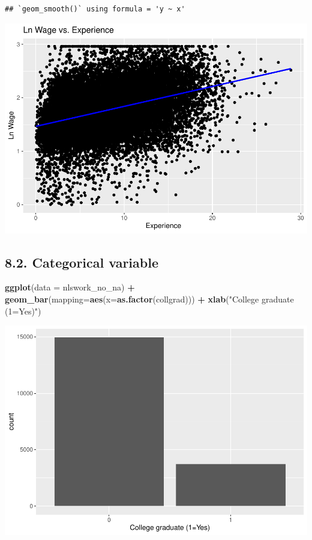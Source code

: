 \documentclass[
]{article}
\newenvironment{Shaded}{\begin{snugshade}}{\end{snugshade}}
\newcommand{\AttributeTok}[1]{\textcolor[rgb]{0.13,0.29,0.53}{#1}}
\newcommand{\FunctionTok}[1]{\textcolor[rgb]{0.13,0.29,0.53}{\textbf{#1}}}
\newcommand{\NormalTok}[1]{#1}
\newcommand{\SpecialCharTok}[1]{\textcolor[rgb]{0.81,0.36,0.00}{\textbf{#1}}}
\newcommand{\StringTok}[1]{\textcolor[rgb]{0.31,0.60,0.02}{#1}}
\begin{document}
\begin{verbatim}
## `geom_smooth()` using formula = 'y ~ x'
\end{verbatim}

\includegraphics{RIntro_files/figure-latex/unnamed-chunk-23-1.pdf}

\hypertarget{categorical-variable}{%
\subsection{8.2. Categorical variable}\label{categorical-variable}}

\begin{Shaded}
\begin{Highlighting}[]
\FunctionTok{ggplot}\NormalTok{(}\AttributeTok{data =}\NormalTok{ nlswork\_no\_na) }\SpecialCharTok{+}
  \FunctionTok{geom\_bar}\NormalTok{(}\AttributeTok{mapping=}\FunctionTok{aes}\NormalTok{(}\AttributeTok{x=}\FunctionTok{as.factor}\NormalTok{(collgrad))) }\SpecialCharTok{+}
  \FunctionTok{xlab}\NormalTok{(}\StringTok{"College graduate (1=Yes)"}\NormalTok{)}
\end{Highlighting}
\end{Shaded}

\includegraphics{RIntro_files/figure-latex/unnamed-chunk-24-1.pdf}
\end{document}
